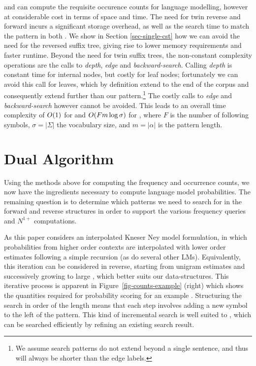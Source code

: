 \nlplusname and \nlplusfrontbackname can compute the requisite occurence counts for \ngram language modelling, however at considerable cost in terms of space and time. 
The need for twin reverse and forward \CSTs incurs a significant storage overhead, as well as the search time to match the pattern in both \CSTs. 
We show in Section \ref{sec-single-cst}  how we can avoid the need for the reversed suffix  tree, giving rise to lower memory requirements and faster runtime. 
Beyond the need for twin suffix trees, the non-constant complexity operations are the calls to \emph{depth}, \emph{edge} and \emph{backward-search}.
Calling \emph{depth} is constant time for internal nodes, but costly for leaf nodes; fortunately we can avoid this call for leaves, which by definition extend to the end of the corpus and consequently extend further than our pattern.\footnote{We assume search patterns do not extend beyond a single sentence, and thus will always be shorter than the edge labels.}
The costly calls to \emph{edge} and \emph{backward-search} however cannot be avoided.
This leads to an overall time complexity of $O(1)$ for \nlplusname and $O(F m \log\sigma)$ for \nlplusfrontbackname, where $F$ is the number of following symbols, $\sigma=|\Sigma|$ the vocabulary size, and $m=|\alpha|$ is the pattern length.

\section{Dual \CST Algorithm} 
\label{sec-dual-cst}

Using the methods above for computing the frequency and occurrence
counts, we now have the ingredients necessary to compute \ngram language model
probabilities. The remaining question is to determine which patterns we need to search for
in the forward and reverse \CST structures in order to support the
various frequency queries and $N^{1+}$ computations.

As this paper considers an interpolated Kneser Ney model formulation, in which
probabilities from higher order contexts are interpolated with lower
order estimates following a simple recursion (as do several other LMs). 
Equivalently, this iteration can be considered in reverse, starting from unigram
estimates and successively growing to large \ngrams, which better
suits our \CST data-structures.
This iterative process is apparent in Figure~\ref{fig-counts-example} (right) which
shows the quantities required for probability scoring for an example \ngram.
Structuring the search in order of the \ngram length means that each step involves adding a new symbol to the left of the pattern.
This kind of incremental search is well suited to \CSTs, which can be searched efficiently by refining an existing search result.


